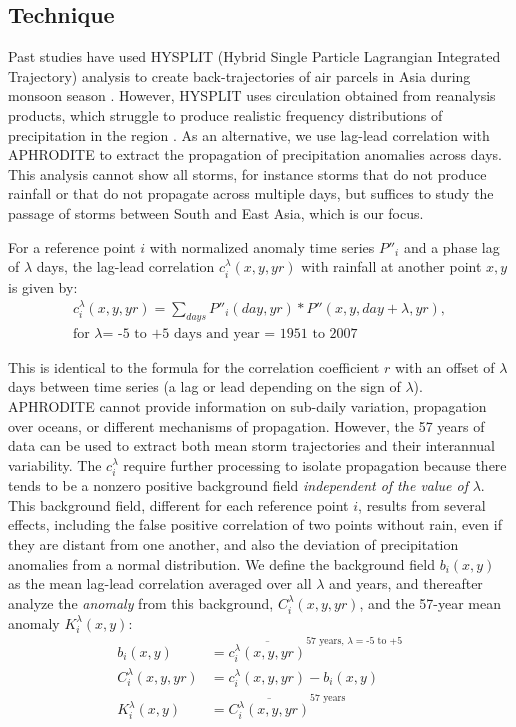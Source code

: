 \subsection{Technique}

	Past studies have used HYSPLIT (Hybrid Single Particle Lagrangian Integrated Trajectory) analysis to create back-trajectories of air parcels in Asia during monsoon season \citep{Medina2010,Cai2012,Gao2013}. However, HYSPLIT uses circulation obtained from reanalysis products, which struggle to produce realistic frequency distributions of precipitation in the region \citep{Pena-Arancibia2013}. As an alternative, we use lag-lead correlation with APHRODITE to extract the propagation of precipitation anomalies across days. This analysis cannot show all storms, for instance storms that do not produce rainfall or that do not propagate across multiple days, but suffices to study the passage of storms between South and East Asia, which is our focus.
	
	For a reference point $i$ with normalized anomaly time series $P''_i$ and a phase lag of $\lambda$ days, the lag-lead correlation $c_i^\lambda(x,y,yr)$ with rainfall at another point $x,y$ is given by:
\begin{gather*}
	c_i^\lambda(x,y,yr)=\sum_{days}P''_i(day,yr)*P''(x,y,day+\lambda,yr),\\
	\text{for } \lambda \text{= -5 to +5 days and year = 1951 to 2007}
\end{gather*}
	
	 This is identical to the formula for the correlation coefficient $r$ with an offset of $\lambda$ days between time series (a lag or lead depending on the sign of $\lambda$). APHRODITE cannot provide information on sub-daily variation, propagation over oceans, or different mechanisms of propagation. However, the 57 years of data can be used to extract both mean storm trajectories and their interannual variability. The $c_i^\lambda$ require further processing to isolate propagation because there tends to be a nonzero positive background field \textit{independent of the value of} $\lambda$. This background field, different for each reference point $i$, results from several effects, including the false positive correlation of two points without rain, even if they are distant from one another, and also the deviation of precipitation anomalies from a normal distribution. We define the background field $b_i(x,y)$ as the mean lag-lead correlation averaged over all $\lambda$ and years, and thereafter analyze the \textit{anomaly} from this background, $C_i^\lambda(x,y,yr)$, and the 57-year mean anomaly $K_i^\lambda(x,y)$:
\begin{align*}
	b_i(x,y) &=\overline{c_i^\lambda(x,y,yr)}^{57\text{ years, }\lambda = \text{-5 to +5}} \\
	C_i^\lambda(x,y,yr) &= c_i^\lambda(x,y,yr)-b_i(x,y) \\
	K_i^\lambda(x,y) &= \overline{C_i^\lambda(x,y,yr)}^{57\text{ years}}
\end{align*}
		
